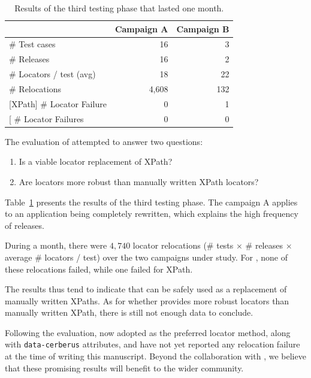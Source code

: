 \begin{table}[]
\centering
\begin{tabular}{l|r|r|}
\cline{2-3}
                                                       & \bf Campaign A & \bf Campaign B \\ \hline
\multicolumn{1}{|l|}{\# Test cases}                        & 16         & 3          \\ \hline
\multicolumn{1}{|l|}{\# Releases}                          & 16         & 2          \\ \hline
\multicolumn{1}{|l|}{\# Locators / test (avg)}             & 18         & 22          \\ \hline
\multicolumn{1}{|l|}{\# Relocations}                       & 4,608       & 132         \\ \hline
\multicolumn{1}{|l|}{{[}XPath{]} \# Locator Failure} & 0          & 1          \\ \hline
\multicolumn{1}{|l|}{{[}\erratum{}{]} \# Locator Failures} & 0          & 0          \\ \hline
\end{tabular}
\caption{Results of the third testing phase that lasted one month.}
\label{table:results}
\end{table}

The evaluation of \erratum attempted to answer two questions:
\begin{enumerate}
\item Is \erratum a viable locator replacement of XPath?
\item Are \erratum locators more robust than manually written XPath locators?
\end{enumerate}

Table~\ref{table:results} presents the results of the third testing phase.
The campaign A applies to an application being completely rewritten, which explains the high frequency of releases.

During a month, there were $4,740$ locator relocations (\# tests $\times$ \# releases $\times$ average \# locators / test) over the two campaigns under study.
For \erratum, none of these relocations failed, while one failed for XPath.

The results thus tend to indicate that \erratum can be safely used as a replacement of manually written {\sc XPaths}.
As for whether \erratum provides more robust locators than manually written XPath, there is still not enough data to conclude. 

Following the evaluation, \laredoute{} now adopted \erratum as the preferred locator method, along with \texttt{data-cerberus} attributes, and have not yet reported any relocation failure at the time of writing this manuscript.
Beyond the collaboration with \laredoute, we believe that these promising results will benefit to the wider \cerberus community.

